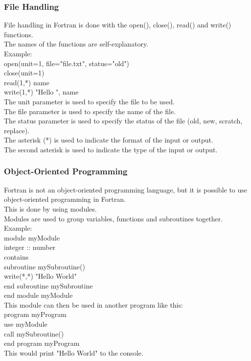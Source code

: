 \documentclass[11pt,a4paper]{scrartcl}
\begin{document}
\begin{center}
\subsubsection{File Handling}%
File handling in Fortran is done with the open(), close(), read() and write() functions.\\
The names of the functions are self-explanatory.\\
Example:\\
open(unit=1, file="file.txt", status="old")\\
close(unit=1)\\
read(1,*) name\\
write(1,*) "Hello ", name\\
The unit parameter is used to specify the file to be used.\\
The file parameter is used to specify the name of the file.\\
The status parameter is used to specify the status of the file (old, new, scratch, replace).\\
The asterisk (*) is used to indicate the format of the input or output.\\
The second asterisk is used to indicate the type of the input or output.\\

\subsubsection{Object-Oriented Programming}
Fortran is not an object-oriented programming language, but it is possible to use object-oriented programming in Fortran.\\
This is done by using modules.\\
Modules are used to group variables, functions and subroutines together.\\
Example:\\
module myModule\\
integer :: number\\
contains\\
subroutine mySubroutine()\\
write(*,*) "Hello World"\\
end subroutine mySubroutine\\
end module myModule\\
This module can then be used in another program like this:\\
program myProgram\\
use myModule\\
call mySubroutine()\\
end program myProgram\\
This would print "Hello World" to the console.\\


\end{center}
\end{document}
